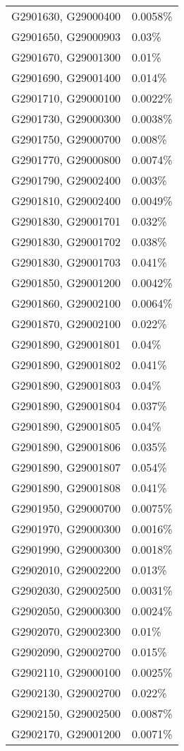 \begin{longtable}[]{@{}ll@{}}
G2901630, G29000400 & 0.0058\% \\
G2901650, G29000903 & 0.03\% \\
G2901670, G29001300 & 0.01\% \\
G2901690, G29001400 & 0.014\% \\
G2901710, G29000100 & 0.0022\% \\
G2901730, G29000300 & 0.0038\% \\
G2901750, G29000700 & 0.008\% \\
G2901770, G29000800 & 0.0074\% \\
G2901790, G29002400 & 0.003\% \\
G2901810, G29002400 & 0.0049\% \\
G2901830, G29001701 & 0.032\% \\
G2901830, G29001702 & 0.038\% \\
G2901830, G29001703 & 0.041\% \\
G2901850, G29001200 & 0.0042\% \\
G2901860, G29002100 & 0.0064\% \\
G2901870, G29002100 & 0.022\% \\
G2901890, G29001801 & 0.04\% \\
G2901890, G29001802 & 0.041\% \\
G2901890, G29001803 & 0.04\% \\
G2901890, G29001804 & 0.037\% \\
G2901890, G29001805 & 0.04\% \\
G2901890, G29001806 & 0.035\% \\
G2901890, G29001807 & 0.054\% \\
G2901890, G29001808 & 0.041\% \\
G2901950, G29000700 & 0.0075\% \\
G2901970, G29000300 & 0.0016\% \\
G2901990, G29000300 & 0.0018\% \\
G2902010, G29002200 & 0.013\% \\
G2902030, G29002500 & 0.0031\% \\
G2902050, G29000300 & 0.0024\% \\
G2902070, G29002300 & 0.01\% \\
G2902090, G29002700 & 0.015\% \\
G2902110, G29000100 & 0.0025\% \\
G2902130, G29002700 & 0.022\% \\
G2902150, G29002500 & 0.0087\% \\
G2902170, G29001200 & 0.0071\% \\

\end{longtable}
